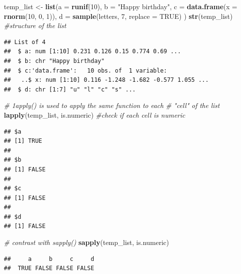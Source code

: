 \documentclass[12pt,]{article}
\newenvironment{Shaded}{\begin{snugshade}}{\end{snugshade}}
\newcommand{\KeywordTok}[1]{\textcolor[rgb]{0.13,0.29,0.53}{\textbf{#1}}}
\newcommand{\DataTypeTok}[1]{\textcolor[rgb]{0.13,0.29,0.53}{#1}}
\newcommand{\DecValTok}[1]{\textcolor[rgb]{0.00,0.00,0.81}{#1}}
\newcommand{\StringTok}[1]{\textcolor[rgb]{0.31,0.60,0.02}{#1}}
\newcommand{\CommentTok}[1]{\textcolor[rgb]{0.56,0.35,0.01}{\textit{#1}}}
\newcommand{\OtherTok}[1]{\textcolor[rgb]{0.56,0.35,0.01}{#1}}
\newcommand{\NormalTok}[1]{#1}
\begin{document}
\begin{Shaded}
\begin{Highlighting}[]
\NormalTok{temp_list <-}\StringTok{ }\KeywordTok{list}\NormalTok{(}\DataTypeTok{a =} \KeywordTok{runif}\NormalTok{(}\DecValTok{10}\NormalTok{),}
                  \DataTypeTok{b =} \StringTok{"Happy birthday"}\NormalTok{,}
                  \DataTypeTok{c =} \KeywordTok{data.frame}\NormalTok{(}\DataTypeTok{x =} \KeywordTok{rnorm}\NormalTok{(}\DecValTok{10}\NormalTok{, }\DecValTok{0}\NormalTok{, }\DecValTok{1}\NormalTok{)),}
                  \DataTypeTok{d =} \KeywordTok{sample}\NormalTok{(letters, }\DecValTok{7}\NormalTok{, }\DataTypeTok{replace =} \OtherTok{TRUE}\NormalTok{)}
\NormalTok{                  )}
\KeywordTok{str}\NormalTok{(temp_list) }\CommentTok{#structure of the list}
\end{Highlighting}
\end{Shaded}

\begin{verbatim}
## List of 4
##  $ a: num [1:10] 0.231 0.126 0.15 0.774 0.69 ...
##  $ b: chr "Happy birthday"
##  $ c:'data.frame':   10 obs. of  1 variable:
##   ..$ x: num [1:10] 0.116 -1.248 -1.682 -0.577 1.055 ...
##  $ d: chr [1:7] "u" "l" "c" "s" ...
\end{verbatim}

\begin{Shaded}
\begin{Highlighting}[]
\CommentTok{# 1apply() is used to apply the same function to each}
\CommentTok{# "cell" of the list}
\KeywordTok{lapply}\NormalTok{(temp_list, is.numeric) }\CommentTok{#check if each cell is numeric}
\end{Highlighting}
\end{Shaded}

\begin{verbatim}
## $a
## [1] TRUE
## 
## $b
## [1] FALSE
## 
## $c
## [1] FALSE
## 
## $d
## [1] FALSE
\end{verbatim}

\begin{Shaded}
\begin{Highlighting}[]
\CommentTok{# contrast with sapply()}
\KeywordTok{sapply}\NormalTok{(temp_list, is.numeric)}
\end{Highlighting}
\end{Shaded}

\begin{verbatim}
##     a     b     c     d 
##  TRUE FALSE FALSE FALSE
\end{verbatim}
\end{document}
